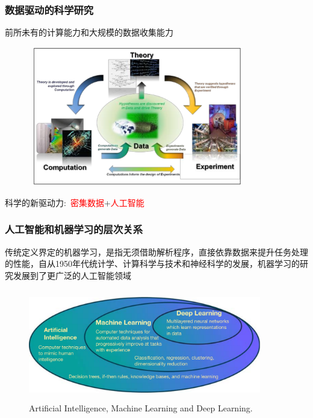 \frame
{
	\frametitle{数据驱动的科学研究}
前所未有的计算能力和大规模的数据收集能力%
\begin{figure}[h!]
\centering
\includegraphics[height=2.40in,width=3.75in]{Figures/Four_Model_1.png}
\label{Four_Model_1}
\end{figure}
科学的新驱动力:~\textcolor{red}{密集数据}+\textcolor{red}{人工智能}
}

\frame
{
	\frametitle{人工智能和机器学习的层次关系}
	传统定义界定的机器学习，是指无须借助解析程序，直接依靠数据来提升任务处理的性能，自从\textrm{1950}年代统计学、计算科学与技术和神经科学的发展，机器学习的研究发展到了更广泛的人工智能领域%
\begin{figure}[h!]
\centering
\vspace*{-0.1in}
\includegraphics[height=1.9in,width=4.0in,viewport=0 0 1275 550,clip]{Figures/Hierarchical_description_AI_ML_DL.png}
\caption{\tiny{\textrm{Artificial Intelligence, Machine Learning and Deep Learning.}}}%
\label{AI-ML}
\end{figure}
}

